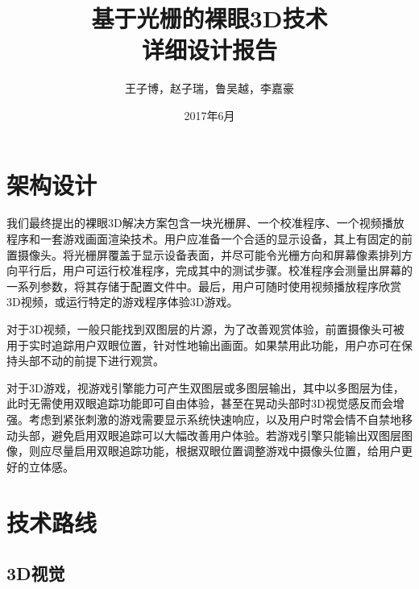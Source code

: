 \documentclass[12pt,a4paper]{article}
\begin{document}
\title{基于光栅的裸眼3D技术\\详细设计报告}
\author{王子博，赵子瑞，鲁吴越，李嘉豪}
\date{2017年6月}

\maketitle
\tableofcontents
\newpage

\section{架构设计}

我们最终提出的裸眼3D解决方案包含一块光栅屏、一个校准程序、一个视频播放程序和一套游戏画面渲染技术。用户应准备一个合适的显示设备，其上有固定的前置摄像头。将光栅屏覆盖于显示设备表面，并尽可能令光栅方向和屏幕像素排列方向平行后，用户可运行校准程序，完成其中的测试步骤。校准程序会测量出屏幕的一系列参数，将其存储于配置文件中。最后，用户可随时使用视频播放程序欣赏3D视频，或运行特定的游戏程序体验3D游戏。

对于3D视频，一般只能找到双图层的片源，为了改善观赏体验，前置摄像头可被用于实时追踪用户双眼位置，针对性地输出画面。如果禁用此功能，用户亦可在保持头部不动的前提下进行观赏。

对于3D游戏，视游戏引擎能力可产生双图层或多图层输出，其中以多图层为佳，此时无需使用双眼追踪功能即可自由体验，甚至在晃动头部时3D视觉感反而会增强。考虑到紧张刺激的游戏需要显示系统快速响应，以及用户时常会情不自禁地移动头部，避免启用双眼追踪可以大幅改善用户体验。若游戏引擎只能输出双图层图像，则应尽量启用双眼追踪功能，根据双眼位置调整游戏中摄像头位置，给用户更好的立体感。

\section{技术路线}

\subsection{3D视觉}
\end{document}
